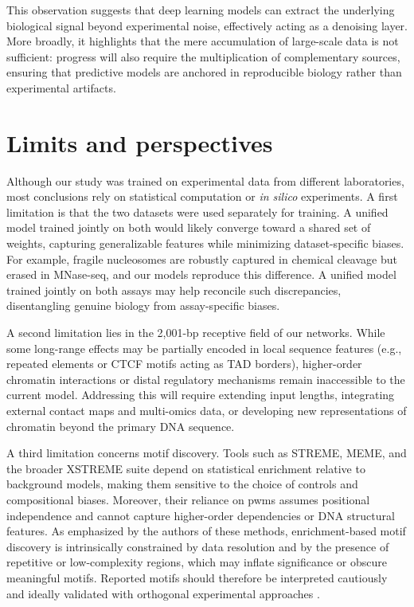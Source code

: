 \documentclass[11pt]{book}
\begin{document}
This observation suggests that deep learning models can extract the underlying biological signal beyond experimental noise, effectively acting as a denoising layer. More broadly, it highlights that the mere accumulation of large-scale data is not sufficient: progress will also require the multiplication of complementary sources, ensuring that predictive models are anchored in reproducible biology rather than experimental artifacts.

\section{Limits and perspectives}
Although our study was trained on experimental data from different laboratories, most conclusions rely on statistical computation or \textit{in silico} experiments. A first limitation is that the two datasets were used separately for training. A unified model trained jointly on both would likely converge toward a shared set of weights, capturing generalizable features while minimizing dataset-specific biases. For example, fragile nucleosomes are robustly captured in chemical cleavage but erased in MNase-seq, and our models reproduce this difference. A unified model trained jointly on both assays may help reconcile such discrepancies, disentangling genuine biology from assay-specific biases.

A second limitation lies in the 2,001-bp receptive field of our networks. While some long-range effects may be partially encoded in local sequence features (e.g., repeated elements or CTCF motifs acting as TAD borders), higher-order chromatin interactions or distal regulatory mechanisms remain inaccessible to the current model. Addressing this will require extending input lengths, integrating external contact maps and multi-omics data, or developing new representations of chromatin beyond the primary DNA sequence.

A third limitation concerns motif discovery. Tools such as STREME, MEME, and the broader XSTREME suite depend on statistical enrichment relative to background models, making them sensitive to the choice of controls and compositional biases. Moreover, their reliance on \glspl{pwm} assumes positional independence and cannot capture higher-order dependencies or DNA structural features. As emphasized by the authors of these methods, enrichment-based motif discovery is intrinsically constrained by data resolution and by the presence of repetitive or low-complexity regions, which may inflate significance or obscure meaningful motifs. Reported motifs should therefore be interpreted cautiously and ideally validated with orthogonal experimental approaches \cite{bailey_streme_2021}.
\end{document}
